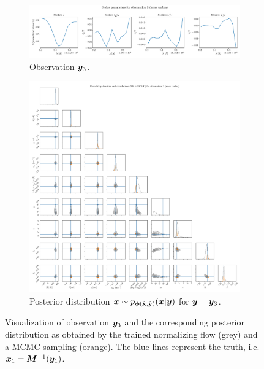 \documentclass[a4paper,12pt]{report}
\begin{document}
\begin{figure}[h]
	\centering
	\begin{subfigure}[t]{\textwidth}
	\centering
	\includegraphics[width=\textwidth]{figures/nf-milne-eddington-example-6-corner-spectrum-3-nf-nflows-piecewisequadratic.pdf}
    \caption{Observation $\bm{y}_3$.}
	\end{subfigure}
	\begin{subfigure}[t]{\textwidth}
	\centering
	\includegraphics[width=\textwidth]{figures/nf-milne-eddington-example-6-corner-3-nf-mcmc-nflows-piecewisequadratic.pdf}
    \caption{Posterior distribution $\bm{x}\sim p_{\bm{\phi}(\hat{\boldsymbol{\mathbf{x}}},\hat{\boldsymbol{\mathbf{y}}})}(\bm{x}|\bm{y})$ for $\bm{y} = \bm{y}_3$.}
	\end{subfigure}
\cprotect\caption{Visualization of observation $\bm{y}_3$ and the corresponding posterior distribution as obtained by the trained normalizing flow (grey) and a MCMC sampling (orange). The blue lines represent the truth, i.e. $\bm{x}_1 = \bm{M}^{-1}(\bm{y}_1)$.}
\label{fig:nf-milne-eddington-example-6-corner-3-nf-piecewisequadratic-results}
\end{figure}
\end{document}
